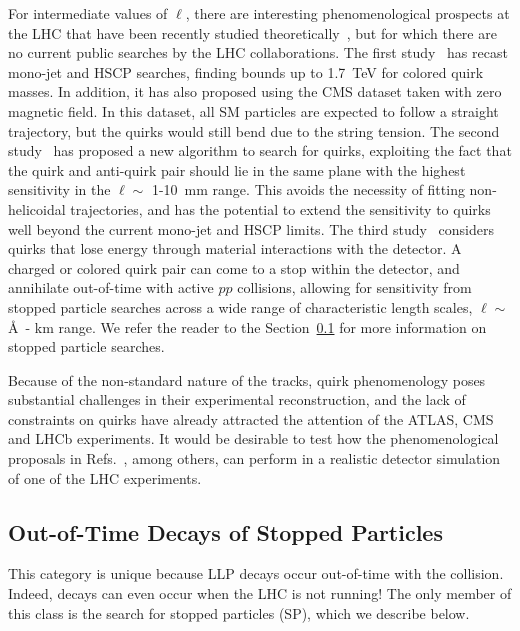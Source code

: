 For intermediate values of $\ell$, there are interesting phenomenological prospects at the LHC that have been recently studied theoretically~\cite{Farina:2017cts,Knapen:2017kly,Evans:2018jmd}, but for which there are no current public searches by the LHC collaborations. The first study~\cite{Farina:2017cts} has recast mono-jet and HSCP searches, finding bounds up to 1.7~TeV for colored quirk masses. In addition, it has also proposed using the CMS dataset taken with zero magnetic field. In this dataset, all SM particles are expected to follow a straight trajectory, but the quirks would still bend due to the string tension. The second study~\cite{Knapen:2017kly} has proposed a new algorithm to search for quirks, exploiting the fact that the quirk and anti-quirk pair should lie in the same plane with the highest sensitivity in the $\ell \sim$ 1-10~mm range. This avoids the necessity of fitting non-helicoidal trajectories, and has the potential to extend the sensitivity to quirks well beyond the current mono-jet and HSCP limits. The third study~\cite{Evans:2018jmd} considers quirks that lose energy through material interactions with the detector.  A charged or colored quirk pair can come to a stop within the detector, and annihilate out-of-time with active $pp$ collisions, allowing for sensitivity from stopped particle searches across a wide range of characteristic length scales, $\ell \sim$ \AA\ - km range.  We refer the reader to the Section~\ref{sec:outoftime} for more information on stopped particle searches.

Because of the non-standard nature of the tracks, quirk phenomenology poses substantial challenges in their experimental reconstruction, and the lack of constraints on quirks have already attracted the attention of the ATLAS, CMS and LHCb experiments. It would be desirable to test how the phenomenological proposals in Refs.~\cite{Farina:2017cts,Knapen:2017kly,Evans:2018jmd}, among others, can perform in a realistic detector simulation of one of the LHC experiments.



\subsection{Out-of-Time Decays of Stopped Particles}
\label{sec:outoftime}

This category is unique because LLP decays occur out-of-time with the collision. Indeed, decays can even occur when the LHC is not running! The only member of this class is the search for stopped particles (SP), which we describe below.

